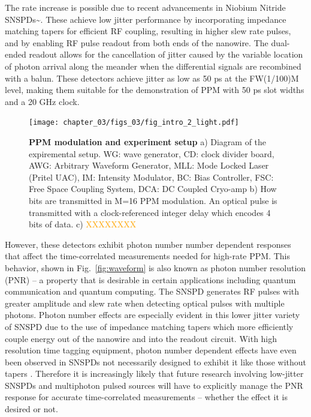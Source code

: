 \documentclass[11pt]{caltech_thesis} %
\begin{document}
The rate increase is possible due to recent advancements in Niobium
Nitride SNSPDs\textasciitilde{}\autocite{Colangelo2023}. These achieve
low jitter performance by incorporating impedance matching tapers for
efficient RF coupling, resulting in higher slew rate pulses, and by
enabling RF pulse readout from both ends of the nanowire. The dual-ended
readout allows for the cancellation of jitter caused by the variable
location of photon arrival along the meander when the differential
signals are recombined with a balun. These detectors achieve jitter as
low as 50 ps at the FW(1/100)M level, making them suitable for the
demonstration of PPM with 50 ps slot widths and a 20 GHz clock.

\hypertarget{fig:intro}{%
\begin{figure}
\centering
\texttt{[image: chapter\_03/figs\_03/fig\_intro\_2\_light.pdf]}
\caption[{PPM modulation and experiment setup}]{\textbf{PPM modulation
and experiment setup} a) Diagram of the expiremental setup. WG: wave
generator, CD: clock divider board, AWG: Arbitrary Waveform Generator,
MLL: Mode Locked Laser (Pritel UAC), IM: Intensity Modulator, BC: Bias
Controller, FSC: Free Space Coupling System, DCA: DC Coupled Cryo-amp b)
How bits are transmitted in M=16 PPM modulation. An optical pulse is
transmitted with a clock-referenced integer delay which encodes 4 bits
of data. c) \textcolor{orange}{XXXXXXXX}}
\label{fig:intro}
\end{figure}
}

However, these detectors exhibit photon number number dependent
responses that affect the time-correlated measurements needed for
high-rate PPM. This behavior, shown in Fig.~\ref{fig:waveform} is also
known as photon number resolution (PNR) -- a property that is desirable
in certain applications including quantum communication and quantum
computing. The SNSPD generates RF pulses with greater amplitude and slew
rate when detecting optical pulses with multiple photons. Photon number
effects are especially evident in this lower jitter variety of SNSPD due
to the use of impedance matching tapers which more efficiently couple
energy out of the nanowire and into the readout circuit. With high
resolution time tagging equipment, photon number dependent effects have
even been observed in SNSPDs not necessarily designed to exhibit it
\autocite[\textcite{sauer2023resolving}]{schapeler2023superconducting}
like those without tapers \autocite{Cahall2017SlewRatePNR}. Therefore it
is increasingly likely that future research involving low-jitter SNSPDs
and multiphoton pulsed sources will have to explicitly manage the PNR
response for accurate time-correlated measurements -- whether the effect
it is desired or not.
\end{document}

